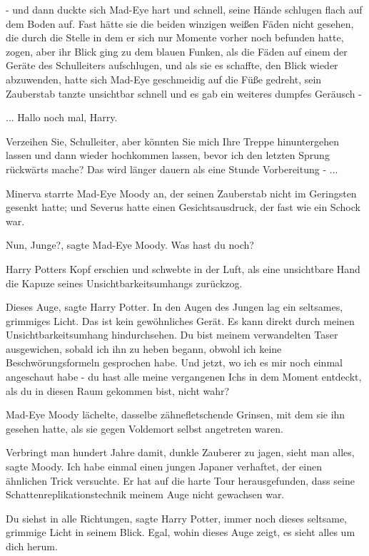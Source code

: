 - und dann duckte sich Mad-Eye hart und schnell, seine Hände schlugen flach auf
dem Boden auf. Fast hätte sie die beiden winzigen weißen Fäden nicht gesehen,
die durch die Stelle in dem er sich nur Momente vorher noch befunden hatte,
zogen, aber ihr Blick ging zu dem blauen Funken, als die Fäden auf einem der
Geräte des Schulleiters aufschlugen, und als sie es schaffte, den Blick wieder
abzuwenden, hatte sich Mad-Eye geschmeidig auf die Füße gedreht, sein Zauberstab
tanzte unsichtbar schnell und es gab ein weiteres dumpfes Geräusch -

... \glqq Hallo noch mal, Harry.\grqq{}

\glqq Verzeihen Sie, Schulleiter, aber könnten Sie mich Ihre Treppe
hinuntergehen lassen und dann wieder hochkommen lassen, bevor ich den letzten
Sprung rückwärts mache? Das wird länger dauern als eine Stunde Vorbereitung
-\grqq{} ...

Minerva starrte Mad-Eye Moody an, der seinen Zauberstab nicht im Geringsten
gesenkt hatte; und Severus hatte einen Gesichtsausdruck, der fast wie ein Schock
war.

\glqq Nun, Junge?\grqq{}, sagte Mad-Eye Moody. \glqq Was hast du noch?\grqq{}

Harry Potters Kopf erschien und schwebte in der Luft, als eine unsichtbare Hand
die Kapuze seines Unsichtbarkeitsumhangs zurückzog.

\glqq Dieses Auge\grqq{}, sagte Harry Potter. In den Augen des Jungen lag ein
seltsames, grimmiges Licht. \glqq Das ist kein gewöhnliches Gerät. Es kann
direkt durch meinen Unsichtbarkeitsumhang hindurchsehen. Du bist meinem
verwandelten Taser ausgewichen, sobald ich ihn zu heben begann, obwohl ich keine
Beschwörungsformeln gesprochen habe. Und jetzt, wo ich es mir noch einmal
angeschaut habe - du hast alle meine vergangenen Ichs in dem Moment entdeckt,
als du in diesen Raum gekommen bist, nicht wahr?\grqq{}

Mad-Eye Moody lächelte, dasselbe zähnefletschende Grinsen, mit dem sie ihn
gesehen hatte, als sie gegen Voldemort selbst angetreten waren.

\glqq Verbringt man hundert Jahre damit, dunkle Zauberer zu jagen, sieht man
alles\grqq{}, sagte Moody. \glqq Ich habe einmal einen jungen Japaner verhaftet,
der einen ähnlichen Trick versuchte. Er hat auf die harte Tour herausgefunden,
dass seine Schattenreplikationstechnik meinem Auge nicht gewachsen war.\grqq{}

\glqq Du siehst in alle Richtungen\grqq{}, sagte Harry Potter, immer noch dieses
seltsame, grimmige Licht in seinem Blick. \glqq Egal, wohin dieses Auge zeigt,
es sieht alles um dich herum.\grqq{}

